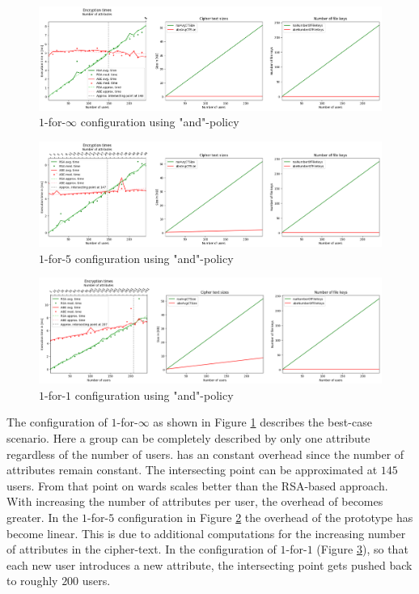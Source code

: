 \begin{figure}[!t]
\centering
    \includegraphics[width=\linewidth]{img/eval-and-policy/encrypt_incrementing_10.png}
    \caption{$1$-for-$\infty$ configuration using "and"-policy}
    \label{fig:1-for-infty-and}
\end{figure}
\begin{figure}[!t]
\centering
    \includegraphics[width=\linewidth]{img/eval-and-policy/encrypt_incrementing_10_attribute_increment_1per5User.png}
    \caption{$1$-for-$5$ configuration using "and"-policy}
    \label{fig:1-for-5-and}
\end{figure}
\begin{figure}[!t]
\centering
    \includegraphics[width=\linewidth]{img/eval-and-policy/encrypt_incrementing_10_attribute_increment_1per1User.png}
    \caption{$1$-for-$1$ configuration using "and"-policy}
    \label{fig:1-for-1-and}
\end{figure}

The configuration of $1$-for-$\infty$ as shown in Figure \ref{fig:1-for-infty-and} describes the best-case scenario. Here a group can be completely described by only one attribute regardless of the number of users. \name has an constant overhead since the number of attributes remain constant. The intersecting point can be approximated at $145$ users. From that point on wards \name scales better than the RSA-based approach. With increasing the number of attributes per user, the overhead of \name becomes greater. In the $1$-for-$5$ configuration in Figure \ref{fig:1-for-5-and} the overhead of the prototype has become linear. This is due to additional computations for the increasing number of attributes in the cipher-text. In the configuration of $1$-for-$1$  (Figure \ref{fig:1-for-1-and}), so that each new user introduces a new attribute, the intersecting point gets pushed back to roughly $200$ users. 

